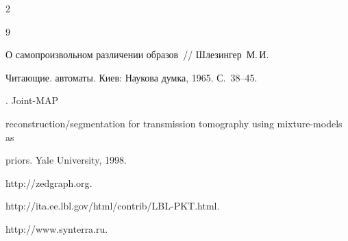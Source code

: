 \begin{multicols}{2}
{{\begin{thebibliography}{9}


 О самопроизвольном различении образов~// Шлезингер~М.\,И. 


Читающие. автоматы. Киев: Наукова думка, 1965. С.~38--45. \vspace*{5pt} 




. Joint-MAP 


reconstruction/segmentation for transmission tomography using mixture-models as 


priors. Yale University, 1998. \vspace*{5pt} 




{\sf http://zedgraph.org}. \vspace*{4pt} 




{\sf http://ita.ee.lbl.gov/html/contrib/LBL-PKT.html}. \vspace*{5pt} 




{\sf http://www.synterra.ru}.


\end{thebibliography}





} } \label{end\stat}


\end{multicols}


